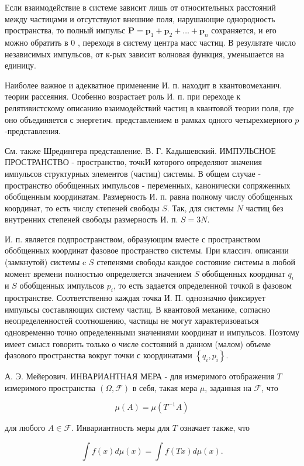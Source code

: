 \documentclass[10pt]{article}
\begin{document}
Если взаимодействие в системе зависит лишь от относительных расстояний между частицами и отсутствуют внешние поля, нарушающие однородность пространства, то полный импульс $\boldsymbol{P}=\boldsymbol{p}_{1}+\boldsymbol{p}_{2}+\ldots+\boldsymbol{p}_{n}$ сохраняется, и его можно обратить в 0 , переходя в систему центра масс частиц. В результате число независимых импульсов, от к-рых зависит волновая функция, уменьшается на единицу.



Наиболее важное и адекватное применение И. п. находит в квантовомеханич. теории рассеяния. Особенно возрастает роль И. п. при переходе к релятивистскому описанию взаимодействий частиц в квантовой теории поля, где оно объединяется с энергетич. представлением в рамках одного четырехмерного $p$-представления.



См. также Шредингера представление. В. Г. Кадышевский. ИМПУЛЬСНОЕ ПРОСТРАНСТВО - пространство, точкИ которого определяют значения импульсов структурных элементов (частиц) системы. В общем случае - пространство обобщенных импульсов - переменных, канонически сопряженных обобщенным координатам. Размерность И. п. равна полному числу обобщенных координат, то есть числу степеней свободы $S$. Так, для системы $N$ частиц без внутренних степеней свободы размерность И. п. $S=3 N$.



И. п. является подпространством, образующим вместе с пространством обобщенных координат фазовое пространство системы. При классич. описании (замкнутой) системы c $S$ степенями свободы каждое состояние системы в любой момент времени полностью определяется значением $S$ обобщенных координат $q_{i}$ и $S$ обобщенных импульсов $p_{i}$, то есть задается определенной точкой в фазовом пространстве. Соответственно каждая точка И. П. однозначно фиксирует импульсы составляющих систему частиц. В квантовой механике, согласно неопределенностей соотношению, частицы не могут характеризоваться одновременно точно определенными значениями координат и импульсов. Поэтому имеет смысл говорить только о числе состояний в данном (малом) объеме фазового пространства вокруг точки с координатами $\left\{q_{i}, p_{i}\right\}$.



А. Э. Мейерович. ИНВАРИАНТНАЯ МЕРА - для измеримого отображения $T$ измеримого пространства $(\Omega, \mathscr{F})$ в себя, такая мера $\mu$, заданная на $\mathscr{F}$, что



\[

\mu(A)=\mu\left(T^{-1} A\right)

\]



для любого $A \in \mathscr{F}$. Инвариантность меры для $T$ означает также, что



\[

\int f(x) d \mu(x)=\int f(T x) d \mu(x) .

\]
\end{document}
